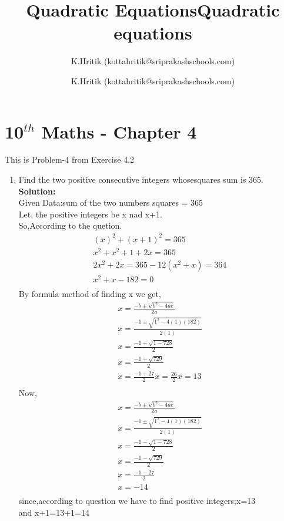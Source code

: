 \documentclass[12pt]{article}
\title{Quadratic Equations}
\author{ K.Hritik (kottahritik@sriprakashschools.com)}
\title{Quadratic equations}
\author{K.Hritik (kottahritik@sriprakashschools.com)}
\newcommand{\solution}{\noindent \textbf{Solution: }}
\begin{document}
\section*{10$^{th}$ Maths - Chapter 4}
This is Problem-4 from Exercise 4.2
\begin{enumerate}
\item Find the two positive consecutive integers whosesquares sum is 365.  \\
\solution \\
Given Data:sum of the two numbers squares = 365\\
Let, the positive integers be x nad x+1.\\
So,According to the quetion.
\begin{align}
(x)^{2} + (x+1)^{2} = 365 \\
x^{2} + x^{2} + 1 + 2x = 365 \\
2x^{2} +2x = 365 -1
2(x^{2} +x) = 364\\
x^{2} + x - 182 = 0\\
\end{align}
By formula method of finding x we get,\\
\begin{align}
x = {\frac{-b\pm\sqrt{b^2-4ac}}{2a}}\\
x = {\frac{-1\pm\sqrt{1^2-4(1)(182)}}{2(1)}}\\
x={\frac{-1 +\sqrt{1-728}}{2}}\\
x={\frac{-1 +\sqrt{729}}{2}}\\
x={\frac{-1 + 27}{2}}
x={\frac{26}{2}}
x= 13\\
\end{align}
Now,\\
\begin{align}
x = {\frac{-b\pm\sqrt{b^2-4ac}}{2a}}\\
x = {\frac{-1\pm\sqrt{1^2-4(1)(182)}}{2(1)}}\\
x={\frac{-1 -\sqrt{1-728}}{2}}\\
x={\frac{-1 -\sqrt{729}}{2}}\\
x={\frac{-1 - 27}{2}}\\
x=-14\\
\end{align}
since,according to question we have to find positive integers;x=13\\
and x+1=13+1=14\\
\end{enumerate}
\end{document}
